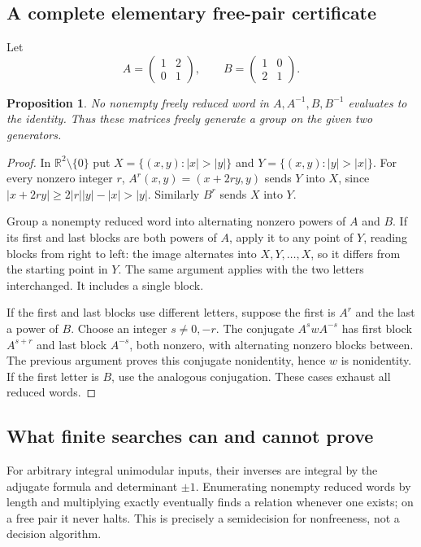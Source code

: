 \documentclass[11pt]{article}
\newtheorem{proposition}{Proposition}
\begin{document}
\subsection{A complete elementary free-pair certificate}
Let
\[
 A=\begin{pmatrix}1&2\\0&1\end{pmatrix},\qquad
 B=\begin{pmatrix}1&0\\2&1\end{pmatrix}.
\]
\begin{proposition}
No nonempty freely reduced word in $A,A^{-1},B,B^{-1}$ evaluates to the identity. Thus these matrices freely generate a group on the given two generators.
\end{proposition}
\begin{proof}
In $\mathbb R^2\setminus\{0\}$ put $X=\{(x,y):|x|>|y|\}$ and $Y=\{(x,y):|y|>|x|\}$. For every nonzero integer $r$, $A^r(x,y)=(x+2ry,y)$ sends $Y$ into $X$, since $|x+2ry|\ge2|r||y|-|x|>|y|$. Similarly $B^r$ sends $X$ into $Y$.

Group a nonempty reduced word into alternating nonzero powers of $A$ and $B$. If its first and last blocks are both powers of $A$, apply it to any point of $Y$, reading blocks from right to left: the image alternates into $X,Y,\ldots,X$, so it differs from the starting point in $Y$. The same argument applies with the two letters interchanged. It includes a single block.

If the first and last blocks use different letters, suppose the first is $A^r$ and the last a power of $B$. Choose an integer $s\ne0,-r$. The conjugate $A^s w A^{-s}$ has first block $A^{s+r}$ and last block $A^{-s}$, both nonzero, with alternating nonzero blocks between. The previous argument proves this conjugate nonidentity, hence $w$ is nonidentity. If the first letter is $B$, use the analogous conjugation. These cases exhaust all reduced words.
\end{proof}
\subsection{What finite searches can and cannot prove}
For arbitrary integral unimodular inputs, their inverses are integral by the adjugate formula and determinant $\pm1$. Enumerating nonempty reduced words by length and multiplying exactly eventually finds a relation whenever one exists; on a free pair it never halts. This is precisely a semidecision for nonfreeness, not a decision algorithm.
\end{document}
